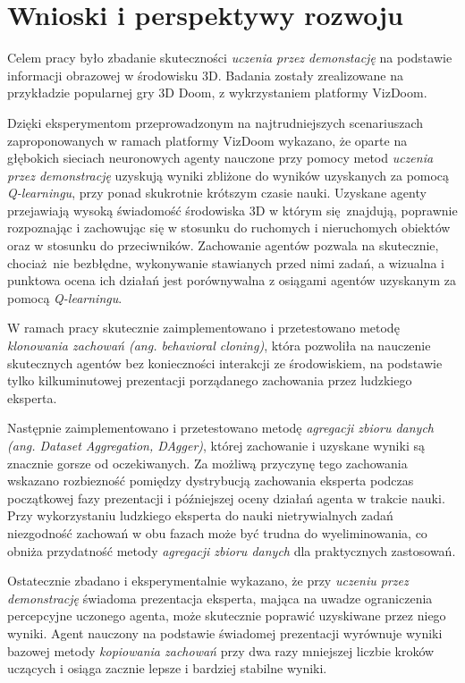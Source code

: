 \chapter{Wnioski i perspektywy rozwoju}

Celem pracy było zbadanie skuteczności \textit{uczenia przez demonstację} na podstawie informacji obrazowej w środowisku 3D. Badania zostały zrealizowane na przykładzie popularnej gry 3D Doom, z wykrzystaniem platformy VizDoom.

Dzięki eksperymentom przeprowadzonym na najtrudniejszych scenariuszach zaproponowanych w ramach platformy VizDoom wykazano, że oparte na głębokich sieciach neuronowych agenty nauczone przy pomocy metod \textit{uczenia przez demonstrację} uzyskują wyniki zbliżone do wyników uzyskanych za pomocą \textit{Q-learningu}, przy ponad skukrotnie krótszym czasie nauki. Uzyskane agenty przejawiają wysoką świadomość środowiska 3D w którym się znajdują, poprawnie rozpoznając i zachowując się w stosunku do ruchomych i nieruchomych obiektów oraz w stosunku do przeciwników. Zachowanie agentów pozwala na skutecznie, chociaż nie bezbłędne, wykonywanie stawianych przed nimi zadań, a wizualna i punktowa ocena ich działań jest porównywalna z osiągami agentów uzyskanym za pomocą \textit{Q-learningu}.

W ramach pracy skutecznie zaimplementowano i przetestowano metodę \textit{klonowania zachowań (ang. behavioral cloning)}, która pozwoliła na nauczenie skutecznych agentów bez konieczności interakcji ze środowiskiem, na podstawie tylko kilkuminutowej prezentacji porządanego zachowania przez ludzkiego eksperta.

Następnie zaimplementowano i przetestowano metodę \textit{agregacji zbioru danych (ang. Dataset Aggregation, DAgger)}, której zachowanie i uzyskane wyniki są znacznie gorsze od oczekiwanych. Za możliwą przyczynę tego zachowania wskazano rozbiezność pomiędzy dystrybucją zachowania eksperta podczas początkowej fazy prezentacji i późniejszej oceny działań agenta w trakcie nauki. Przy wykorzystaniu ludzkiego eksperta do nauki nietrywialnych zadań niezgodność zachowań w obu fazach może być trudna do wyeliminowania, co obniża przydatność metody \textit{agregacji zbioru danych} dla praktycznych zastosowań.

Ostatecznie zbadano i eksperymentalnie wykazano, że przy \textit{uczeniu przez demonstrację} świadoma prezentacja eksperta, mająca na uwadze ograniczenia percepcyjne uczonego agenta, może skutecznie poprawić uzyskiwane przez niego wyniki. Agent nauczony na podstawie świadomej prezentacji wyrównuje wyniki bazowej metody \textit{kopiowania zachowań} przy dwa razy mniejszej liczbie kroków uczących i osiąga zacznie lepsze i bardziej stabilne wyniki.

